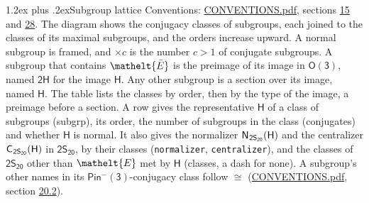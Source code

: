 \documentclass[10pt,a4paper]{article}
\makeatletter
\renewcommand\section{\@startsection{section}{1}{\z@}{-3ex plus -1ex minus -.2ex}%
  {1.2ex plus .2ex}{\normalfont\large\sffamily\bfseries\color{parttitle}}}
\numberwithin{equation}{section}
\newcommand{\eltfont}[1]{{\let\sigma\eltsigma\mathelt{#1}}}
\newcommand{\grp}[1]{\mathsf{#1}}
\newcommand{\cls}[1]{\eltfont{#1}}
\newcommand{\elt}[1]{\eltfont{#1}}
\newcommand{\samecls}{\cong}
\newcommand{\barred}[1]{\bar{#1}}
\newcommand{\hairsp}{\mkern1mu}
\makeatother
\begin{document}
\section{Subgroup lattice}\label{s:subgroups}
Conventions: \href{../../CONVENTIONS.pdf}{CONVENTIONS.pdf}, sections \href{../../../rotation/CONVENTIONS.pdf\#conv.15}{15} and \href{../../CONVENTIONS.pdf\#conv.28}{28}.
The diagram shows the conjugacy classes of subgroups, each joined to the classes of its maximal subgroups, and the orders increase upward. \label{n:index.conjugates.c}A normal subgroup is framed, and ${\times}c$ is the number $c > 1$ of conjugate subgroups. \label{n:group.H}A subgroup that contains $\elt{\barred{E}}$ is the preimage of its image in $\grp{O(3)}$, named $\grp{2H}$ for the image $\grp{H}$. Any other subgroup is a section over its image, named $\grp{H}$. The table lists the classes by order, then by the type of the image, a preimage before a section. \label{n:head.subgroup}\label{n:head.order}\label{n:head.conjugates}\label{n:head.normal}A row gives the representative $\grp{H}$ of a class of subgroups (subgrp), its order, the number of subgroups in the class (conjugates) and whether $\grp{H}$ is normal. \label{n:group.normalizer}\label{n:group.centralizer}\label{n:head.classes}It also gives the normalizer $\grp{N}_{\hairsp \grp{2S_{20}}}(\grp{H})$ and the centralizer $\grp{C}_{\hairsp \grp{2S_{20}}}(\grp{H})$ in $\grp{2S_{20}}$, by their classes (\texttt{normalizer}, \texttt{centralizer}), and the classes of $\grp{2S_{20}}$ other than $\cls{E}$ met by $\grp{H}$ (classes, a dash for none). A subgroup's other names in its \href{Pinminus3.pdf}{$\grp{Pin^{-}(3)}$}-conjugacy class follow $\samecls$ (\href{../../CONVENTIONS.pdf}{CONVENTIONS.pdf}, section \href{../../CONVENTIONS.pdf\#conv.20.2}{20.2}).
\begin{center}
\end{center}
\end{document}
